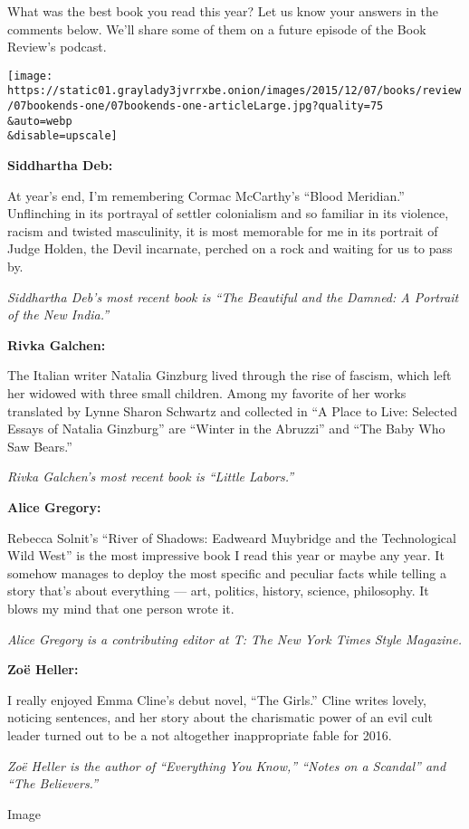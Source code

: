 What was the best book you read this year? Let us know your answers in
the comments below. We'll share some of them on a future episode of the
Book Review's podcast.

\texttt{[image: https://static01.graylady3jvrrxbe.onion/images/2015/12/07/books/review/07bookends-one/07bookends-one-articleLarge.jpg?quality=75\\\&auto=webp\\\&disable=upscale]}

\textbf{Siddhartha Deb:}

At year's end, I'm remembering Cormac McCarthy's ``Blood Meridian.''
Unflinching in its portrayal of settler colonialism and so familiar in
its violence, racism and twisted masculinity, it is most memorable for
me in its portrait of Judge Holden, the Devil incarnate, perched on a
rock and waiting for us to pass by.

\emph{Siddhartha Deb's most recent book is ``The Beautiful and the
Damned: A Portrait of the New India.''}

\textbf{Rivka Galchen:}

The Italian writer Natalia Ginzburg lived through the rise of fascism,
which left her widowed with three small children. Among my favorite of
her works translated by Lynne Sharon Schwartz and collected in ``A Place
to Live: Selected Essays of Natalia Ginzburg'' are ``Winter in the
Abruzzi'' and ``The Baby Who Saw Bears.''

\emph{Rivka Galchen's most recent book is ``Little Labors.''}

\textbf{Alice Gregory:}

Rebecca Solnit's ``River of Shadows: Eadweard Muybridge and the
Technological Wild West'' is the most impressive book I read this year
or maybe any year. It somehow manages to deploy the most specific and
peculiar facts while telling a story that's about everything --- art,
politics, history, science, philosophy. It blows my mind that one person
wrote it.

\emph{Alice Gregory is a contributing editor at T: The New York Times
Style Magazine.}

\textbf{Zoë Heller:}

I really enjoyed Emma Cline's debut novel, ``The Girls.'' Cline writes
lovely, noticing sentences, and her story about the charismatic power of
an evil cult leader turned out to be a not altogether inappropriate
fable for 2016.

\emph{Zoë Heller is the author of ``Everything You Know,'' ``Notes on a
Scandal'' and ``The Believers.''}

Image

